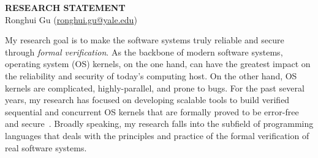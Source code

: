 \documentclass[a4paper, 10pt]{article}
\newcommand*{\email}[1]{\normalsize\href{mailto:#1}{#1}}
\begin{document}
\thispagestyle{fancy}
\lhead{}
\rhead{}
\renewcommand{\headrulewidth}{0pt} 
\renewcommand{\footrulewidth}{0pt} 


\pagestyle{fancy}
\lhead{\textcolor{gray}{\it Ronghui Gu}}
\rhead{\textcolor{gray}{\thepage/\totalpages{}}}

\begin{small}

\begin{center}
{\LARGE \bf RESEARCH STATEMENT}\\
\vspace*{0.2cm}
{\normalsize Ronghui Gu (\email{ronghui.gu@yale.edu})}
\end{center}



My research goal is to make the software systems truly reliable and secure through \emph{formal verification}.
As the backbone of 
modern software systems,
operating system (OS) kernels,
on the one hand,
 can have the greatest impact on the reliability and security of today's computing host.
On the other hand, OS kernels are complicated, highly-parallel, and prone to bugs. For the past several years,  my research has focused on developing scalable tools to build verified sequential and concurrent OS kernels that are formally proved to be error-free and secure~\cite{popl15-gu, osdi16-gu, pldi16-security, pldi16-device}.
Broadly speaking, my research
falls into the subfield of programming languages that deals with the 
principles and practice of the formal verification
of real software systems.



\end{small}
\end{document}
